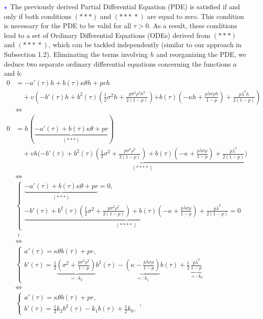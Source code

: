 \documentclass[11pt]{article}
\numberwithin{equation}{section}
\begin{document}
\newpage
$\textcolor{blue}{\star}$ The previously derived Partial Differential Equation
(PDE) is satisfied if and only if both conditions $(***)$ and $(***\:*)$ are
equal to zero. This condition is necessary for the PDE to be valid for all $\tau
> 0$. As a result, these conditions lead to a set of Ordinary Differential
Equations (ODEs) derived from $(***)$ and $(***\:*)$, which can be tackled
independently (similar to our approach in Subsection 1.2). Eliminating the terms involving $h$ and reorganizing the PDE, we
deduce two separate ordinary differential equations concerning the functions $a$
and $b$:
\begin{align*}
    0 &= -a'(\tau)h + b(\tau)\kappa\theta h + prh \\
    &\quad+ v\left( -b'(\tau)h + b^2(\tau) \left( \frac{1}{2} \sigma^2 h + \frac{p\sigma^2\rho^2 h^2}{2(1 - p)} \right) \right. \left. + b(\tau) \left( -\kappa h + \frac{p\bar{\lambda}\sigma\rho h}{1 - p} \right) + \frac{p\bar{\lambda}^2h}{2(1 - p)} \right) \\
    &\iff\\
     0 &= h\left(\underbrace{-a'(\tau) + b(\tau)\kappa\theta + pr}_{(***)}\right) \\
     &\quad + vh \bigg( \underbrace{-b'(\tau) + b^2(\tau) \left( \frac{1}{2} \sigma^2 + \frac{p\sigma^2\rho^2}{2(1 - p)} \right)+ b(\tau) \left( -\kappa + \frac{p\bar{\lambda}\sigma\rho}{1 - p} \right) + \frac{p\bar{\lambda}^2}{2(1 - p)}}_{(****)} \bigg)\\
    &\iff\\
    &\begin{cases}
    \underbrace{- a'(\tau) + b(\tau)\kappa\theta + pr}_{(***)} = 0, &  \\
    \underbrace{- b'(\tau) + b^2(\tau) \left( \frac{1}{2} \sigma^2 + \frac{p\sigma^2\rho^2}{2(1-p)} \right) + b(\tau) \left( -\kappa + \frac{p\bar{\lambda}\sigma\rho }{1-p} \right) + \frac{p\bar{\lambda}^2}{2(1-p)}}_{(****)} = 0 &
    \end{cases} \\
    &\overset{\dagger}{\iff}\\
    &\begin{cases}
    a'(\tau) = \kappa\theta b(\tau) + pr, \\
    b'(\tau) = \frac{1}{2} \underbrace{\left( \sigma^2 + \frac{p\sigma^2\rho^2}{1 - p} \right)}_{=:k_2}b^2(\tau) - \underbrace{\left( \kappa - \frac{p\bar{\lambda}\sigma\rho }{1 - p} \right)}_{=:k_1} b(\tau)+\frac{1}{2}\underbrace{\frac{p\bar{\lambda}^2}{1-p}}_{=:k_0}
    \end{cases} \\
    &\iff\\
    &\begin{cases}
    a'(\tau) = \kappa\theta b(\tau) + pr, \\
    b'(\tau) = \frac{1}{2} k_2 b^2(\tau) - k_1 b(\tau) + \frac{1}{2} k_0,
    \end{cases},
\end{align*}
\end{document}
